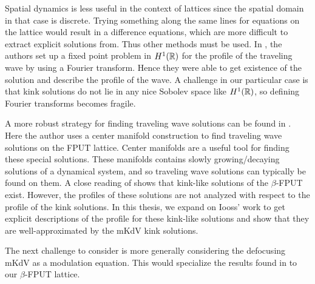 Spatial dynamics is less useful in the context of lattices since the spatial domain in that case is discrete. Trying something along the same lines for equations on the lattice would result in a difference equations, which are more difficult to extract explicit solutions from. Thus other methods must be used. In \cite{friesecke1999solitary}, the authors set up a fixed point problem in \(H^1(\mathbb{R})\) for the profile of the traveling wave by using a Fourier transform. Hence they were able to get existence of the solution and describe the profile of the wave. A challenge in our particular case is that kink solutions do not lie in any nice Sobolev space like \(H^1(\mathbb{R})\), so defining Fourier transforms becomes fragile.

A more robust strategy for finding traveling wave solutions can be found in \cite{iooss2000travelling}. Here the author uses a center manifold construction to find traveling wave solutions on the FPUT lattice. Center manifolds are a useful tool for finding these special solutions. These manifolds contains slowly growing/decaying solutions of a dynamical system, and so traveling wave solutions can typically be found on them. A close reading of \cite{iooss2000travelling} shows that kink-like solutions of the \(\beta\)-FPUT exist. However, the profiles of these solutions are not analyzed with respect to the profile of the kink solutions. In this thesis, we expand on Iooss' work to get explicit descriptions of the profile for these kink-like solutions and show that they are well-approximated by the mKdV kink solutions.

The next challenge to consider is more generally considering the defocusing mKdV as a modulation equation. This would specialize the results found in \cite{schneider2000counter,khan2017long} to our \(\beta\)-FPUT lattice.